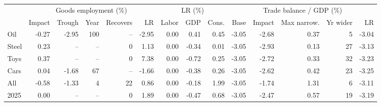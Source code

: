 \begin{tabular}{lrrrrrrrrrrrrr}
\toprule
 & \multicolumn{5}{c}{Goods employment (\%)} & \multicolumn{3}{c}{LR (\%)} & \multicolumn{5}{c}{Trade balance / GDP (\%)} \\
\cmidrule(lr){2-6}\cmidrule(lr){7-9}\cmidrule(lr){10-14}
 & Impact & Trough & Year & Recovers & LR & Labor & GDP & Cons. & Base & Impact & Max narrow. & Yr wider & LR \\
\midrule
Oil & -0.27 & -2.95 & 100 & -- & -2.95 & 0.00 & 0.41 & 0.45 & -3.05 & -2.68 & 0.37 & 5 & -3.04 \\
Steel & 0.23 & -- & -- & 0 & 1.13 & 0.00 & -0.34 & 0.01 & -3.05 & -2.93 & 0.13 & 27 & -3.13 \\
Toys & 0.37 & -- & -- & 0 & 7.38 & 0.00 & -0.72 & 0.25 & -3.05 & -2.72 & 0.33 & 32 & -3.23 \\
Cars & 0.04 & -1.68 & 67 & -- & -1.66 & 0.00 & -0.38 & 0.26 & -3.05 & -2.62 & 0.42 & 23 & -3.25 \\
All & -0.58 & -1.33 & 4 & 22 & 0.86 & 0.00 & -0.18 & 1.99 & -3.05 & -1.74 & 1.31 & 6 & -3.11 \\
2025 & 0.00 & -- & -- & 0 & 1.89 & 0.00 & -0.47 & 0.68 & -3.05 & -2.47 & 0.57 & 19 & -3.19 \\
\bottomrule
\end{tabular}
